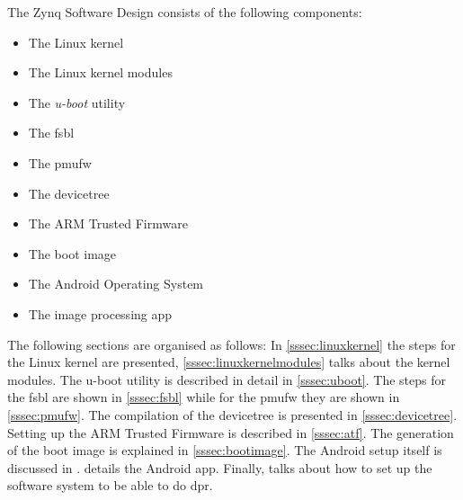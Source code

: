 The Zynq Software Design consists of the following components:
\begin{itemize}
	\item The Linux kernel
	\item The Linux kernel modules
	\item The \emph{u-boot} utility
	\item The \gls{fsbl}
	\item The \gls{pmufw}
	\item The devicetree
	\item The ARM Trusted Firmware
	\item The boot image
	\item The Android Operating System
	\item The image processing app
\end{itemize}

The following sections are organised as follows: In \cref{sssec:linuxkernel} the steps for the Linux kernel are presented, \cref{sssec:linuxkernelmodules} talks about the kernel modules. The u-boot utility is described in detail in \cref{sssec:uboot}. The steps for the \gls{fsbl} are shown in \cref{sssec:fsbl} while for the \gls{pmufw} they are shown in \cref{sssec:pmufw}. The compilation of the devicetree is presented in \cref{sssec:devicetree}. Setting up the ARM Trusted Firmware is described in \cref{sssec:atf}. The generation of the boot image is explained in \cref{sssec:bootimage}. The Android setup itself is discussed in .  details the Android app. Finally,  talks about how to set up
the software system to be able to do \gls{dpr}.
